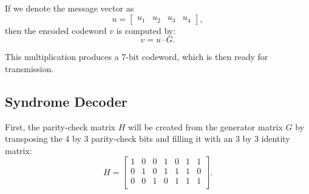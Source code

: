 \documentclass{article}
\begin{document}
If we denote the message vector as 
\begin{equation*}
    u =
        \begin{bmatrix}
        u_1 & u_2 & u_3 & u_4 
        \end{bmatrix},
\end{equation*}
then the encoded codeword $v$ is computed by:
\begin{equation*}
    v = u \cdot G .
\end{equation*}

This multiplication produces a 7-bit codeword, which is then ready for transmission.





\subsection{Syndrome Decoder}
First, the parity-check matrix $H$ will be created from the generator matrix $G$ by transposing the 4 by 3 parity-check bits and filling it with an 3 by 3 identity matrix:
\begin{equation*}
H = 
\begin{bmatrix}
1 & 0 & 0 & 1 & 0 & 1 & 1 \\
0 & 1 & 0 & 1 & 1 & 1 & 0 \\
0 & 0 & 1 & 0 & 1 & 1 & 1 \\
\end{bmatrix} .
\end{equation*}
\end{document}
